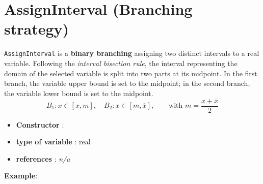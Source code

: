 \section{AssignInterval (Branching strategy)}\label{assigninterval:assignintervalbranchstrat}\hypertarget{assigninterval:assignintervalbranchstrat}{}
\begin{notedef}
  \texttt{AssignInterval} is a \textbf{binary branching} assigning two distinct intervals to a real variable. Following the \emph{interval bisection rule}, the interval representing the domain of the selected variable is split into two parts at its midpoint. In the first branch, the variable upper bound is set to the midpoint; in the second branch, the variable lower bound is set to the midpoint.
$$B_1: x\in[\underline{x}, m],\quad B_2: x\in[m, \overline{x}],\qquad \text{with } m=\frac{\underline{x}+\overline{x}}{2}$$
\end{notedef}

\begin{itemize}
	\item \textbf{Constructor} :
	\item \textbf{type of variable} : real
	\item \textbf{references} : \emph{n/a}
\end{itemize}

\textbf{Example}:
%

